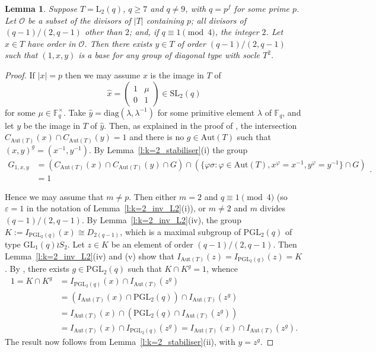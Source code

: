 \documentclass[twoside,a4paper,reqno,11pt]{amsart}
\newcommand{\e}{\varepsilon}
\newcommand{\<}{\langle}
\renewcommand{\>}{\rangle}
\newcommand{\geqs}{\geqslant}
\newcommand{\Aut}{\mathrm{Aut}}
\newcommand{\GL}{\mathrm{GL}}
\newcommand{\PGL}{\mathrm{PGL}}
\newcommand{\SL}{\mathrm{SL}}
\newcommand{\LL}{\mathrm{L}}
\newtheorem{lem}[thm]{Lemma}
\theoremstyle{definition}
\begin{document}
\begin{lem}\label{l:k=2_L2_pre}
    Suppose $T = \LL_2(q)$, $q\geqs 7$ and $q\ne 9$, with $q = p^f$ for some prime $p$. Let $\mathcal{O}$ be a subset of the divisors of $|T|$ containing $p$; all divisors of $(q-1)/(2,q-1)$ other than $2$; and, if $q\equiv 1\pmod 4$, the integer $2$. Let $x\in T$ have order in $\mathcal{O}$. Then there exists $y\in T$ of order $(q-1)/(2,q-1)$ such that $(1,x,y)$ is a base for any group of diagonal type with socle $T^2$.
\end{lem}

\begin{proof}
    If $|x| = p$ then we may assume $x$ is the image in $T$ of
    \begin{equation*}
        \widehat{x} = 
        \begin{pmatrix}
            1 & \mu \\
            0 & 1
        \end{pmatrix} \in\SL_2(q)
    \end{equation*}
    for some $\mu\in\mathbb{F}_q^\times$. Take $\widehat{y} = \mathrm{diag}(\lambda,\lambda^{-1})$ for some primitive element $\lambda$ of $\mathbb{F}_q$, and let $y$ be the image in $T$ of $\widehat{y}$. Then, as explained in the proof of \cite[Lemma 3.20]{FHLR_Saxl}, the intersection $C_{\Aut(T)}(x)\cap C_{\Aut(T)}(y) = 1$ and there is no $g\in \Aut(T)$ such that $(x,y)^g = (x^{-1},y^{-1})$. By Lemma~\ref{l:k=2_stabiliser}(i) the group 
    \[\begin{array}{rl} G_{1,x, y} & = (C_{\Aut(T)}(x) \cap C_{\Aut(T)}(y) \cap  G) \cap (\{\varphi \sigma: \varphi \in \Aut(T), x^\varphi = x^{-1}, y^{\varphi} = y^{-1}\} \cap G)\\& = 1 \end{array}.\] 

    Hence we may assume that $m \ne p$. Then either $m = 2$ and $q\equiv 1\pmod 4$ (so $\e = 1$ in the notation of Lemma~\ref{l:k=2_inv_L2}(i)), or $m\ne 2$ and $m$ divides $(q-1)/(2,q-1)$.  By Lemma~\ref{l:k=2_inv_L2}(iv), the group $K:=I_{\PGL_2(q)}(x) \cong D_{2(q-1)}$, which is a maximal subgroup of $\PGL_2(q)$ of type $\GL_1(q)\wr S_2$. Let $z\in K$ be an element of order $(q-1)/(2,q-1)$. Then Lemma~\ref{l:k=2_inv_L2}(iv) and (v) show  that $I_{\Aut(T)}(z) = I_{\PGL_2(q)}(z) = K$. By \cite[Theorem 2.1]{J_base}, there exists $g\in \PGL_2(q)$ such that $K\cap K^g = 1$, whence
    \begin{equation*}
    \begin{aligned}
        1 = K\cap K^g &= I_{\PGL_2(q)}(x)\cap I_{\Aut(T)}(z^g) \\
        &= (I_{\Aut(T)}(x)\cap \PGL_2(q))\cap I_{\Aut(T)}(z^g) \\
        &= I_{\Aut(T)}(x)\cap (\PGL_2(q)\cap I_{\Aut(T)}(z^g)) \\
        &= I_{\Aut(T)}(x)\cap I_{\PGL_2(q)}(z^g) 
        = I_{\Aut(T)}(x)\cap I_{\Aut(T)}(z^g).
    \end{aligned}
    \end{equation*}
    The result now follows from Lemma~\ref{l:k=2_stabiliser}(ii), with $y = z^g$.
\end{proof}
\end{document}
